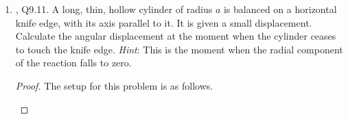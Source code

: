 \documentclass[../psets.tex]{subfiles}
\begin{document}
\begin{enumerate}
\begin{proof}
\begin{align*}
            \frac{GM}{r_\alpha^3}|\vec{r}_\alpha| &= |\vec{\omega}|\,|\dot{\vec{r}}_\alpha|\sin\ang{90}\\
            \frac{GM}{r_\alpha^3}r_\alpha &= |\vec{\omega}|\,|\vec{\omega}\times\vec{r}_\alpha|\,1\\
            \frac{GM}{r_\alpha^2} &= |\vec{\omega}|\,|\vec{\omega}|\,|\vec{r}_\alpha|\sin\ang{90}\\
            &= \omega^2r_\alpha\\
            \sqrt[3]{\frac{GM}{\omega^2}} &= r_\alpha
        \end{align*}
        \endgroup
    \end{proof}
    \item \textcite{bib:KibbleBerkshire}, Q9.11. A long, thin, hollow cylinder of radius $a$ is balanced on a horizontal knife edge, with its axis parallel to it. It is given a small displacement. Calculate the angular displacement at the moment when the cylinder ceases to touch the knife edge. \emph{Hint}: This is the moment when the radial component of the reaction falls to zero.
    \begin{proof}
        The setup for this problem is as follows.
        \begin{center}
\end{center}
\end{proof}
\end{enumerate}
\end{document}
